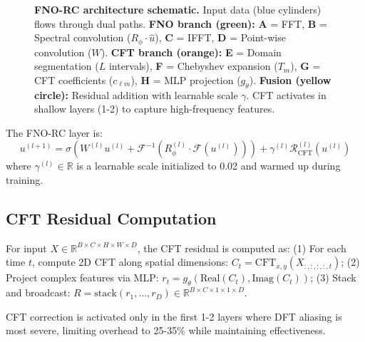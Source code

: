 \documentclass[11pt]{article}
\newcommand{\R}{\mathbb{R}}
\newcommand{\F}{\mathcal{F}}
\begin{document}
\begin{figure}[t]
\caption{\textbf{FNO-RC architecture schematic.} Input data (blue cylinders) flows through dual paths. \textbf{FNO branch (green):} \textbf{A} = FFT, \textbf{B} = Spectral convolution ($R_\phi \cdot \hat{u}$), \textbf{C} = IFFT, \textbf{D} = Point-wise convolution ($W$). \textbf{CFT branch (orange):} \textbf{E} = Domain segmentation ($L$ intervals), \textbf{F} = Chebyshev expansion ($T_m$), \textbf{G} = CFT coefficients ($c_{\ell m}$), \textbf{H} = MLP projection ($g_\theta$). \textbf{Fusion (yellow circle):} Residual addition with learnable scale $\gamma$. CFT activates in shallow layers (1-2) to capture high-frequency features.}
\label{fig:architecture}
\end{figure}

The FNO-RC layer is:
\begin{equation}
u^{(l+1)} = \sigma\left( W^{(l)} u^{(l)} + \F^{-1}\left( R_\phi^{(l)} \cdot \F(u^{(l)}) \right) \right) + \gamma^{(l)} \mathcal{R}_{\text{CFT}}^{(l)}(u^{(l)})
\end{equation}
where $\gamma^{(l)} \in \R$ is a learnable scale initialized to 0.02 and warmed up during training.

\subsection{CFT Residual Computation}

For input $X \in \R^{B \times C \times H \times W \times D}$, the CFT residual is computed as: (1) For each time $t$, compute 2D CFT along spatial dimensions: $C_t = \text{CFT}_{x,y}(X_{:,:,:,:,t})$; (2) Project complex features via MLP: $r_t = g_\theta(\text{Real}(C_t), \text{Imag}(C_t))$; (3) Stack and broadcast: $R = \text{stack}(r_1, \ldots, r_D) \in \R^{B \times C \times 1 \times 1 \times D}$.

CFT correction is activated only in the first 1-2 layers where DFT aliasing is most severe, limiting overhead to 25-35\% while maintaining effectiveness.
\end{document}
